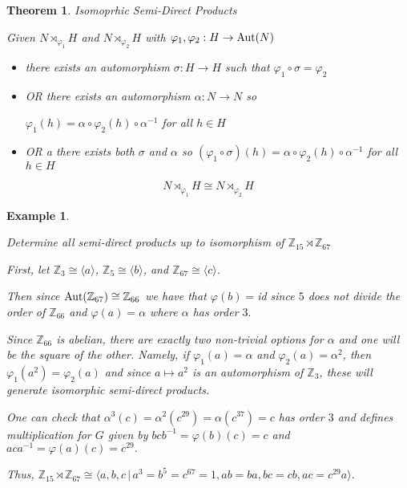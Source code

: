 \documentclass[12pt]{Qual}
\newtheorem{theorem}{Theorem}
\newtheorem{example}{Example}
\begin{document}
\vspace{-0.25cm}
\begin{theorem}{\Large\textit{Isomoprhic Semi-Direct Products}}

Given $N\rtimes_{\varphi_1}H$ and $N\rtimes_{\varphi_2}H$ with $\varphi_1,\varphi_2:H\to\text{Aut}(N)$

\vspace{-0.5cm}

\begin{itemize}[leftmargin=2.5cm]
\renewcommand\labelitemi{\faPuzzlePiece}
    \item there exists an automorphism $\sigma:H\to H$ such that $\varphi_1\circ\sigma=\varphi_2$
    \item \textit{OR} there exists an automorphism $\alpha:N\to N$ so

    $\varphi_1(h)=\alpha\circ\varphi_2(h)\circ \alpha^{-1}$ for all $h\in H$
    \item \textit{OR} a there exists both $\sigma$ and $\alpha$ so $(\varphi_1\circ\sigma)(h)=\alpha\circ\varphi_2(h)\circ \alpha^{-1}$ for all $h\in H$
\end{itemize}

 $$N\rtimes_{\varphi_1}H\cong N\rtimes_{\varphi_2}H$$

\end{theorem}
\vspace{-0.25cm}
\begin{example}
$\,$

\begin{framed}
Determine all semi-direct products up to isomorphism of $\mathbb{Z}_{15}\rtimes\mathbb{Z}_{67}$
\end{framed}

First, let $\mathbb{Z}_3\cong\langle a\rangle$, $\mathbb{Z}_5\cong\langle b\rangle$, and $\mathbb{Z}_{67}\cong\langle c\rangle$.

Then since $\text{Aut}(\mathbb{Z}_{67})\cong\mathbb{Z}_{66}$ we have that $\varphi(b)=$id since $5$ does not divide the order of $\mathbb{Z}_{66}$ and $\varphi(a)=\alpha$ where $\alpha$ has order $3.$

Since $\mathbb{Z}_{66}$ is abelian, there are exactly two non-trivial options for $\alpha$ and one will be the square of the other. Namely, if $\varphi_1(a)=\alpha$ and $\varphi_2(a)=\alpha^2$, then $\varphi_1(a^2)=\varphi_2(a)$ and since $a\mapsto a^2$ is an automorphism of $\mathbb{Z}_3$, these will generate isomorphic semi-direct products.

One can check that $\alpha^3(c)=\alpha^2(c^{29})=\alpha(c^{37})=c$ has order $3$ and defines multiplication for $G$ given by $bcb^{-1}=\varphi(b)(c)=c$ and $aca^{-1}=\varphi(a)(c)=c^{29}.$

Thus, $\mathbb{Z}_{15}\rtimes\mathbb{Z}_{67}\cong\langle a,b,c\,|\, a^3=b^5=c^{67}=1,ab=ba,bc=cb,ac=c^{29}a\rangle.$
\end{example}
\end{document}
